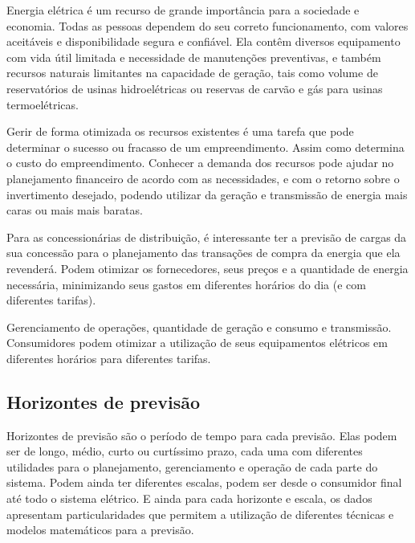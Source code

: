 \documentclass[
	12pt,				%
	oneside,			%
	a4paper,			%
	english,			%
	brazil				%
	]{abntex2}
\begin{document}
	Energia elétrica é um recurso de grande importância para a sociedade e economia. Todas as pessoas dependem do seu correto funcionamento, com valores aceitáveis e disponibilidade segura e confiável. Ela contêm diversos equipamento com vida útil limitada e necessidade de manutenções preventivas, e também recursos naturais limitantes na capacidade de geração, tais como volume de reservatórios de usinas hidroelétricas ou reservas de carvão e gás para usinas termoelétricas. 
	
	Gerir de forma otimizada os recursos existentes é uma tarefa que pode determinar o sucesso ou fracasso de um empreendimento. Assim como determina o custo do empreendimento. Conhecer a demanda dos recursos pode ajudar no planejamento financeiro de acordo com as necessidades, e com o retorno sobre o invertimento desejado, podendo utilizar da geração e transmissão de energia mais caras ou mais mais baratas. 
	
	Para as concessionárias de distribuição, é interessante ter a previsão de cargas da sua concessão para o planejamento das transações de compra da energia que ela revenderá. Podem otimizar os fornecedores, seus preços e a quantidade de energia necessária, minimizando seus gastos em diferentes horários do dia (e com diferentes tarifas).\cite{ReviewSmartMeterLoadForecastingTechniques}
	
	
	 
	
	
	Gerenciamento de operações, quantidade de geração e consumo e transmissão.
Consumidores podem otimizar a utilização de seus equipamentos elétricos em diferentes horários para diferentes tarifas.  



\subsection{Horizontes de previsão}
	Horizontes de previsão são o período de tempo para cada previsão. Elas podem ser de longo, médio, curto ou curtíssimo prazo, cada uma com diferentes utilidades para o planejamento, gerenciamento e operação de cada parte do sistema.	Podem ainda ter diferentes escalas, podem ser desde o consumidor final até todo o sistema elétrico. \cite{ReviewSmartMeterLoadForecastingTechniques} E ainda para cada horizonte e escala, os dados apresentam particularidades que permitem a utilização de diferentes técnicas e modelos matemáticos para a previsão. 
	
\end{document}
